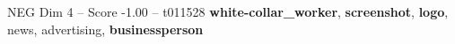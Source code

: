 \begin{textsample}{NEG Dim 4 – Score -1.00 – t011528}  \label{ex:f4_neg_017}
\textbf{white-collar\_worker}, \textbf{screenshot}, \textbf{logo}, news, advertising, \textbf{businessperson}

\end{textsample}
